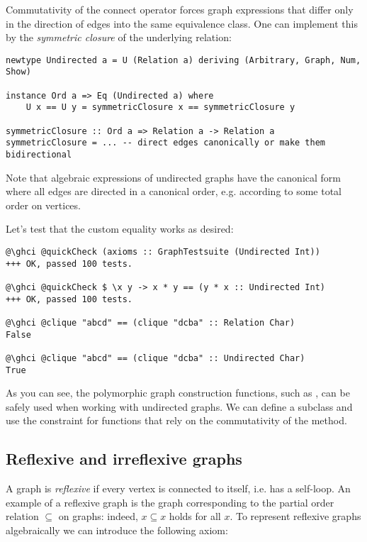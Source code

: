 Commutativity of the connect operator forces graph expressions that differ only
in the direction of edges into the same equivalence class. One can implement
this by the \emph{symmetric closure} of the underlying relation:

\begin{verbatim}
newtype Undirected a = U (Relation a) deriving (Arbitrary, Graph, Num, Show)

instance Ord a => Eq (Undirected a) where
    U x == U y = symmetricClosure x == symmetricClosure y

symmetricClosure :: Ord a => Relation a -> Relation a
symmetricClosure = ... -- direct edges canonically or make them bidirectional
\end{verbatim}

Note that algebraic expressions of undirected graphs have the canonical form where all
edges are directed in a canonical order, e.g. according to some total order on vertices.

Let's test that the custom equality works as desired:
\begin{verbatim}
@\ghci @quickCheck (axioms :: GraphTestsuite (Undirected Int))
+++ OK, passed 100 tests.

@\ghci @quickCheck $ \x y -> x * y == (y * x :: Undirected Int)
+++ OK, passed 100 tests.

@\ghci @clique "abcd" == (clique "dcba" :: Relation Char)
False

@\ghci @clique "abcd" == (clique "dcba" :: Undirected Char)
True
\end{verbatim}

As you can see, the polymorphic graph construction functions, such as ,
can be safely used when working with undirected graphs. We can define a subclass
 and use the 
constraint for functions that rely on the commutativity of the  method.

\subsection{Reflexive and irreflexive graphs}

A graph is \emph{reflexive} if every vertex is connected to itself, i.e. has a self-loop.
An example of a reflexive graph is the graph corresponding to the partial
order relation $\subseteq$ on graphs: indeed, $x \subseteq x$ holds for all $x$. To
represent reflexive graphs algebraically we can introduce the following axiom:

